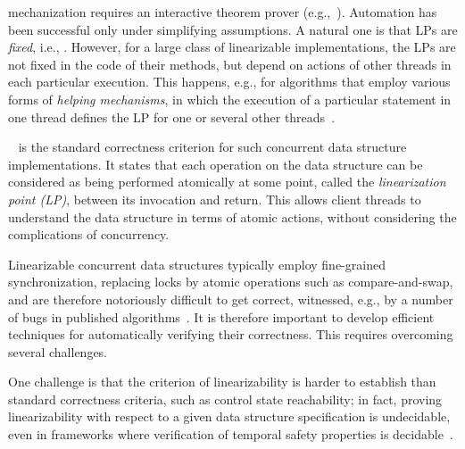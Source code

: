 mechanization requires an interactive theorem prover
(e.g.,~\cite{Colvin:Lazy-List,Derrick:fm14,SDW:tcl14,SWD:cav12}).
Automation has been successful only under simplifying assumptions.
A natural one is that LPs are {\em fixed}, i.e.,
\cite{AHHR:integrated,BLMRS:cav08,Vafeiadis:vmcai09}. 
However, for a large class of linearizable implementations, the LPs are not
fixed in the code of their methods, but depend on
actions of other threads in each particular execution. This
happens, e.g.,
for  algorithms that employ various forms of {\it helping mechanisms},
in which
the execution of a particular statement in one thread defines the LP for one or
several other threads~\cite{Lazyset,HSYstack,Vechev:list,Zhang:unorderedlist}.



~\cite{HeWi:linearizability} is the
standard correctness criterion for such concurrent data structure
implementations. It states that each operation on the data
structure can be considered as being
performed atomically at some point, called the {\em linearization point (LP)},
between its invocation and return.
This allows client threads to understand
the data structure in terms of atomic actions, without considering the
complications of concurrency.

Linearizable concurrent data structures typically employ fine-grained
synchronization, replacing locks by atomic operations
such as compare-and-swap, and are therefore notoriously difficult to get
correct, witnessed, e.g., by a number of bugs  in published
algorithms~\cite{DDGJLMMSS:dcas,MiSc:correction}.
It is therefore important to develop efficient techniques for automatically
verifying their correctness. This requires overcoming several challenges.

One challenge is that the criterion of linearizability is harder
to establish than standard correctness criteria, such as control state
reachability; in fact, proving linearizability with respect to
a given data structure specification is undecidable,
even in frameworks where verification of
temporal safety properties is decidable~\cite{BEEH:esop13}.



